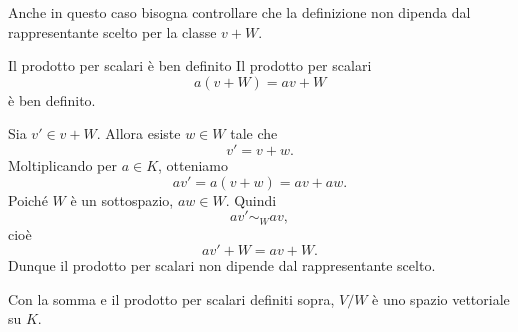 \documentclass[a4paper]{article}
\begin{document}
\begin{radioactive}
Anche in questo caso bisogna controllare che la definizione non dipenda dal rappresentante scelto per la classe \(v+W\).
\end{radioactive}

\begin{radioactive}
\begin{snippetproposition}{Il prodotto per scalari è ben definito}
    Il prodotto per scalari
    \[
        a(v+W)=av+W
    \]
    è ben definito.
\end{snippetproposition}
\end{radioactive}

\begin{radioactive}
\begin{snippetproof}{}
    Sia \(v' \in v+W\). Allora esiste \(w \in W\) tale che
    \[
        v'=v+w.
    \]
    Moltiplicando per \(a \in K\), otteniamo
    \[
        av'=a(v+w)=av+aw.
    \]
    Poiché \(W\) è un sottospazio, \(aw \in W\). Quindi
    \[
        av' \sim_W av,
    \]
    cioè
    \[
        av'+W=av+W.
    \]
    Dunque il prodotto per scalari non dipende dal rappresentante scelto.
\end{snippetproof}
\end{radioactive}

\begin{radioactive}
\begin{snippetproposition}{}
    Con la somma e il prodotto per scalari definiti sopra, \(V/W\) è uno spazio vettoriale su \(K\).
\end{snippetproposition}
\end{radioactive}
\end{document}
